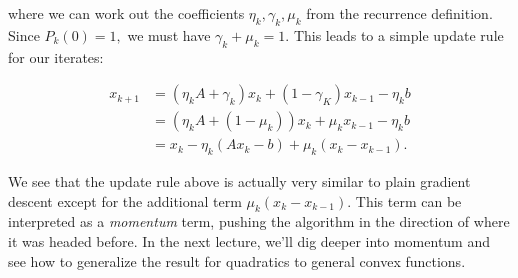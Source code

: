 where we can work out the coefficients $\eta_k,\gamma_k,\mu_k$ from the recurrence definition. Since $P_k(0)=1,$ we must have $\gamma_k+\mu_k=1.$ This leads to a simple update rule for our iterates:

\begin{eqnarray*}
x_{k+1} &= (\eta_k A + \gamma_k)x_k + (1 - \gamma_K)x_{k-1} - \eta_k b \\
&= (\eta_k A + (1 - \mu_k))x_k + \mu_k x_{k-1} - \eta_k b \\
&= x_k - \eta_k(Ax_k - b) + \mu_k(x_k - x_{k-1}).
\end{eqnarray*}

We see that the update rule above is actually very similar to plain gradient descent except for the additional term  $\mu_k(x_k - x_{k-1}).$ This term can be interpreted as a \textit{momentum} term, pushing the algorithm in the direction of where it was headed before. In the next lecture, we'll dig deeper into momentum and see how to generalize the result for quadratics to general convex functions.

